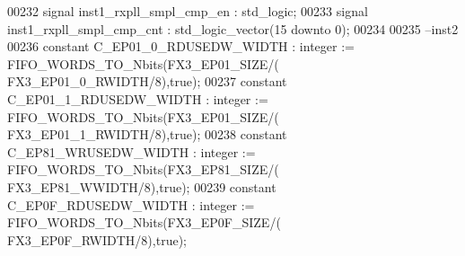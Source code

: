 \begin{DoxyCode}
00232 \textcolor{keywordflow}{signal} \textcolor{vhdlchar}{inst1_rxpll_smpl_cmp_en}   \textcolor{vhdlchar}{:} \textcolor{comment}{std\_logic};
00233 \textcolor{keywordflow}{signal} \textcolor{vhdlchar}{inst1_rxpll_smpl_cmp_cnt}  \textcolor{vhdlchar}{:} \textcolor{comment}{std\_logic\_vector}\textcolor{vhdlchar}{(}\textcolor{vhdllogic}{}\textcolor{vhdllogic}{15} \textcolor{keywordflow}{downto} \textcolor{vhdllogic}{}\textcolor{vhdllogic}{0}\textcolor{vhdlchar}{)};
00234 
00235 \textcolor{keyword}{--inst2}
00236 \textcolor{keywordflow}{constant} \textcolor{vhdlchar}{C_EP01_0_RDUSEDW_WIDTH}  \textcolor{vhdlchar}{:} \textcolor{comment}{integer} \textcolor{vhdlchar}{:=} \textcolor{vhdlchar}{FIFO\_WORDS\_TO\_Nbits}\textcolor{vhdlchar}{(}\textcolor{vhdlchar}{FX3_EP01_SIZE}\textcolor{vhdlchar}{/}\textcolor{vhdlchar}{(}\textcolor{vhdlchar}{
      FX3_EP01_0_RWIDTH}\textcolor{vhdlchar}{/}\textcolor{vhdllogic}{}\textcolor{vhdllogic}{8}\textcolor{vhdlchar}{)}\textcolor{vhdlchar}{,}\textcolor{vhdlchar}{true}\textcolor{vhdlchar}{)};
00237 \textcolor{keywordflow}{constant} \textcolor{vhdlchar}{C_EP01_1_RDUSEDW_WIDTH}  \textcolor{vhdlchar}{:} \textcolor{comment}{integer} \textcolor{vhdlchar}{:=} \textcolor{vhdlchar}{FIFO\_WORDS\_TO\_Nbits}\textcolor{vhdlchar}{(}\textcolor{vhdlchar}{FX3_EP01_SIZE}\textcolor{vhdlchar}{/}\textcolor{vhdlchar}{(}\textcolor{vhdlchar}{
      FX3_EP01_1_RWIDTH}\textcolor{vhdlchar}{/}\textcolor{vhdllogic}{}\textcolor{vhdllogic}{8}\textcolor{vhdlchar}{)}\textcolor{vhdlchar}{,}\textcolor{vhdlchar}{true}\textcolor{vhdlchar}{)};
00238 \textcolor{keywordflow}{constant} \textcolor{vhdlchar}{C_EP81_WRUSEDW_WIDTH}    \textcolor{vhdlchar}{:} \textcolor{comment}{integer} \textcolor{vhdlchar}{:=} \textcolor{vhdlchar}{FIFO\_WORDS\_TO\_Nbits}\textcolor{vhdlchar}{(}\textcolor{vhdlchar}{FX3_EP81_SIZE}\textcolor{vhdlchar}{/}\textcolor{vhdlchar}{(}\textcolor{vhdlchar}{
      FX3_EP81_WWIDTH}\textcolor{vhdlchar}{/}\textcolor{vhdllogic}{}\textcolor{vhdllogic}{8}\textcolor{vhdlchar}{)}\textcolor{vhdlchar}{,}\textcolor{vhdlchar}{true}\textcolor{vhdlchar}{)};
00239 \textcolor{keywordflow}{constant} \textcolor{vhdlchar}{C_EP0F_RDUSEDW_WIDTH}    \textcolor{vhdlchar}{:} \textcolor{comment}{integer} \textcolor{vhdlchar}{:=} \textcolor{vhdlchar}{FIFO\_WORDS\_TO\_Nbits}\textcolor{vhdlchar}{(}\textcolor{vhdlchar}{FX3_EP0F_SIZE}\textcolor{vhdlchar}{/}\textcolor{vhdlchar}{(}\textcolor{vhdlchar}{
      FX3_EP0F_RWIDTH}\textcolor{vhdlchar}{/}\textcolor{vhdllogic}{}\textcolor{vhdllogic}{8}\textcolor{vhdlchar}{)}\textcolor{vhdlchar}{,}\textcolor{vhdlchar}{true}\textcolor{vhdlchar}{)};

\end{DoxyCode}
